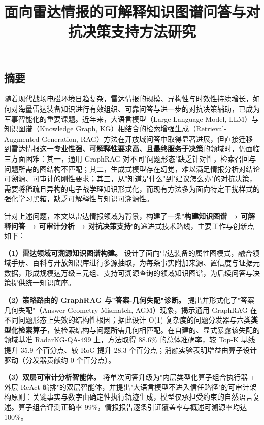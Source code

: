 \documentclass[12pt,a4paper]{ctexart}
\title{\bfseries 面向雷达情报的可解释知识图谱问答与对抗决策支持方法研究}
\author{}
\date{}
\begin{document}
\maketitle
\tableofcontents
\newpage


\subsection*{摘要}

随着现代战场电磁环境日趋复杂，雷达情报的规模、异构性与时效性持续增长，如何对海量雷达装备知识进行有效组织、可靠问答与进一步的对抗决策辅助，已成为军事智能化的重要课题。近年来，大语言模型（Large Language Model, LLM）与知识图谱（Knowledge Graph, KG）相结合的检索增强生成（Retrieval-Augmented Generation, RAG）方法在开放域问答中取得显著进展，但直接迁移到雷达情报这一\textbf{专业性强、可解释性要求高、且最终服务于决策}的领域时，仍面临三方面困难：其一，通用 GraphRAG 对不同"问题形态"缺乏针对性，检索召回与问题所需的图结构不匹配；其二，生成式模型存在幻觉，难以满足情报分析对结论可溯源、可审计的刚性要求；其三，从"知道是什么"到"建议怎么办"的对抗决策，需要将稀疏且异构的电子战学理知识形式化，而现有方法多为面向特定干扰样式的强化学习黑箱，缺乏可解释性与知识可溯源性。

针对上述问题，本文以雷达情报领域为背景，构建了一条"\textbf{构建知识图谱 → 可解释问答 → 可审计分析 → 对抗决策支持}"的递进式技术路线，主要工作与创新点如下：

\textbf{（1）雷达领域可溯源知识图谱构建。} 设计了面向雷达装备的属性图模式，融合领域手册、百科与开放知识库进行多源抽取，为每条事实附加来源、置信度与证据元数据，形成规模达万级三元组、支持可溯源查询的领域知识图谱，为后续问答与决策提供统一知识底座。

\textbf{（2）策略路由的 GraphRAG 与"答案-几何失配"诊断。} 提出并形式化了"答案-几何失配"（Answer-Geometry Mismatch, AGM）现象，揭示通用 GraphRAG 在不同问题形态上失效的结构性根因；据此设计 O(1) 复杂度的问题分发器与六类\textbf{类型化检索算子}，使检索结构与问题所需几何相匹配。在自建的、显式暴露该失配的领域基准 RadarKG-QA-499 上，方法取得 88.6\% 的总体准确率，较 Top-K 基线提升 35.9 个百分点、较 RoG 提升 28.3 个百分点；消融实验表明增益由算子设计驱动（分发器贡献约 0 个百分点）。

\textbf{（3）双层可审计分析智能体。} 将单次问答升级为"内层类型化算子组合执行器 + 外层 ReAct 编排"的双层智能体，并提出"大语言模型不进入信任路径"的可审计架构原则：关键事实与数字由确定性执行轨迹生成，模型仅承担受约束的自然语言复述。算子组合评测正确率 99\%，情报报告逐条引证覆盖率与概述可溯源率均达 100\%。
\end{document}
